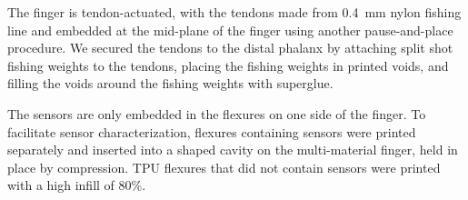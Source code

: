 The finger is tendon-actuated, with the tendons made from \qty{0.4}{\mm} nylon fishing line and embedded at the mid-plane of the finger using another pause-and-place procedure. We secured the tendons to the distal phalanx by attaching split shot fishing weights to the tendons, placing the fishing weights in printed voids, and filling the voids around the fishing weights with superglue. 

The sensors are only embedded in the flexures on one side of the finger. To facilitate sensor characterization, flexures containing sensors were printed separately and inserted into a shaped cavity on the multi-material finger, held in place by compression. TPU flexures that did not contain sensors were printed with a high infill of 80\%. 
